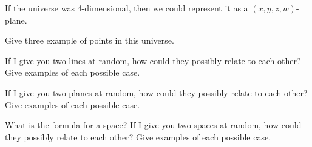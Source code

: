 If the universe was 4-dimensional, then we could represent it as a
$(x,y,z,w)$-plane.

\begin{prob}
Give three example of points in this universe.
\end{prob}


\begin{prob}
If I give you two lines at random, how could they possibly relate to
each other? Give examples of each possible case.
\end{prob}


\begin{prob}
If I give you two planes at random, how could they possibly relate to
each other? Give examples of each possible case.
\end{prob}


\begin{prob}
What is the formula for a space? If I give you two spaces at random,
how could they possibly relate to each other? Give examples of each
possible case.
\end{prob}
